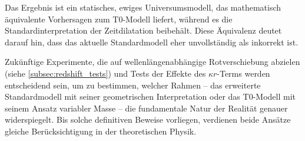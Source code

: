 \documentclass[12pt,a4paper]{article}
\begin{document}
	Das Ergebnis ist ein statisches, ewiges Universumsmodell, das mathematisch äquivalente Vorhersagen zum T0-Modell liefert, während es die Standardinterpretation der Zeitdilatation beibehält. Diese Äquivalenz deutet darauf hin, dass das aktuelle Standardmodell eher unvollständig als inkorrekt ist.
	
	Zukünftige Experimente, die auf wellenlängenabhängige Rotverschiebung abzielen (siehe \cref{subsec:redshift_tests}) und Tests der Effekte des $\kappa r$-Terms werden entscheidend sein, um zu bestimmen, welcher Rahmen – das erweiterte Standardmodell mit seiner geometrischen Interpretation oder das T0-Modell mit seinem Ansatz variabler Masse – die fundamentale Natur der Realität genauer widerspiegelt. Bis solche definitiven Beweise vorliegen, verdienen beide Ansätze gleiche Berücksichtigung in der theoretischen Physik.
	
\end{document}
